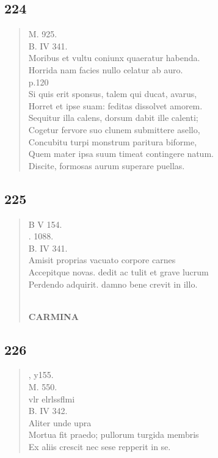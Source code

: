 \documentclass[11pt, a4paper]{report}
\begin{document}
            \subsection*{224}
      \begin{verse}
      M. 925. \\ B. IV 341. \\ Moribus et vultu coniunx quaeratur habenda. \\ Horrida nam facies nullo celatur ab auro. \\ p.120 \\ Si quis erit sponsus, talem qui ducat, avarus, \\ Horret et ipse suam: feditas dissolvet amorem. \\ Sequitur illa calens, dorsum dabit ille calenti; \\ Cogetur fervore suo clunem submittere asello, \\ Concubitu turpi monstrum paritura biforme, \\ Quem mater ipsa suum timeat contingere natum. \\ Discite, formosas aurum superare puellas. \\ 
      \end{verse}
  
            \subsection*{225}
      \begin{verse}
      B V 154. \\ . 1088. \\ B. IV 341. \\ Amisit proprias vacuato corpore carnes \\ Accepitque novas. dedit ac tulit et grave lucrum \\ Perdendo adquirit. damno bene crevit in illo. \\ 
        ﻿\pagebreak 
     \marginpar{[190]} \begin{center} \textbf{CARMINA} \end{center}
      \end{verse}
  
            \subsection*{226}
      \begin{verse}
      , y155. \\ M. 550. \\ vlr elrlssflmi \\ B. IV 342. \\ Aliter unde upra \\ Mortua fit praedo; pullorum turgida membris \\ Ex aliis crescit nec sese repperit in se. \\ 
      \end{verse}
  
\end{document}
